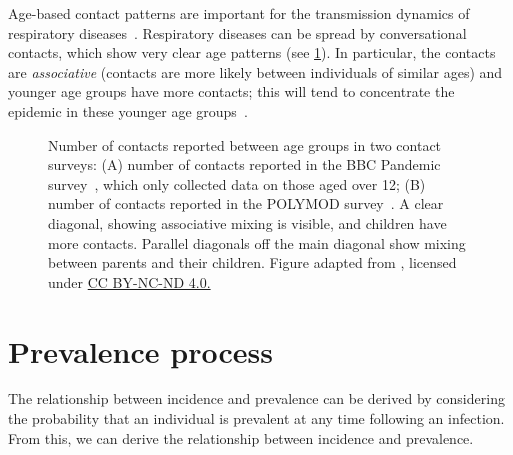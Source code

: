 \documentclass[thesis.tex]{subfiles}
\begin{document}
Age-based contact patterns are important for the transmission dynamics of respiratory diseases~\autocite{birrellBayesian,jacksonEffects}.
Respiratory diseases can be spread by conversational contacts, which show very clear age patterns (see \cref{SEIR:fig:age-contacts}).
In particular, the contacts are \emph{associative} (contacts are more likely between individuals of similar ages) and younger age groups have more contacts; this will tend to concentrate the epidemic in these younger age groups~\autocite[67]{keelingModeling}.
\begin{figure}
  \caption[Age-based contact matrices]{Number of contacts reported between age groups in two contact surveys: (A) number of contacts reported in the BBC Pandemic survey~\autocite{klepacContacts}, which only collected data on those aged over 12; (B) number of contacts reported in the POLYMOD survey~\autocite{mossongSocial}. A clear diagonal, showing associative mixing is visible, and children have more contacts. Parallel diagonals off the main diagonal show mixing between parents and their children. Figure adapted from \textcite{klepacContacts}, licensed under \href{https://creativecommons.org/licenses/by-nc-nd/4.0/}{CC BY-NC-ND 4.0.}}
  \label{SEIR:fig:age-contacts}
\end{figure}

\section{Prevalence process} \label{inc-prev:sec:prevalence-process}

The relationship between incidence and prevalence can be derived by considering the probability that an individual is prevalent at any time following an infection.
From this, we can derive the relationship between incidence and prevalence.
\end{document}
